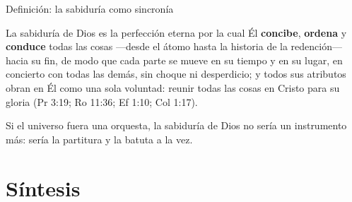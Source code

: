 \documentclass[hyperref={bookmarks=false},aspectratio=169]{beamer}
\newcommand{\destacar}[1]{\textbf{\textcolor{azul}{#1}}}
\begin{document}
\begin{frame}{Definición: la sabiduría como sincronía}
\begin{tcolorbox}[colback=papiro,colframe=azul,boxrule=1pt,arc=3pt]
\small La sabiduría de Dios es la perfección eterna por la cual Él \destacar{concibe}, \destacar{ordena} y \destacar{conduce} todas las cosas ---desde el átomo hasta la historia de la redención--- hacia su fin, de modo que cada parte se mueve en su tiempo y en su lugar, en concierto con todas las demás, sin choque ni desperdicio; y todos sus atributos obran en Él como una sola voluntad: reunir todas las cosas en Cristo para su gloria (Pr 3:19; Ro 11:36; Ef 1:10; Col 1:17).
\end{tcolorbox}
\centering
{}\par\smallskip
\small Si el universo fuera una orquesta, la sabiduría de Dios no sería un instrumento más: sería la partitura y la batuta a la vez.
\end{frame}

\section{Síntesis}
\end{document}
